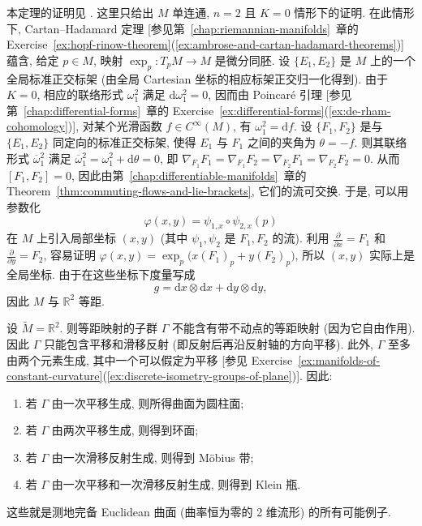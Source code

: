 \begin{RiemannProof}
本定理的证明见 . 这里只给出 $M$ 单连通, $n=2$ 且 $K=0$ 情形下的证明. 在此情形下, Cartan–Hadamard 定理 [参见第~\ref{chap:riemannian-manifolds}~章的 Exercise~\ref{ex:hopf-rinow-theorem}(\ref{ex:ambrose-and-cartan-hadamard-theorems})] 蕴含, 给定 $p\in M$, 映射 $\exp_p:T_pM\to M$ 是微分同胚. 设 $\{E_1,E_2\}$ 是 $M$ 上的一个全局标准正交标架 (由全局 Cartesian 坐标的相应标架正交归一化得到). 由于 $K=0$, 相应的联络形式 $\omega_1^2$ 满足 $\mathrm{d}\omega_1^2=0$, 因而由 Poincaré 引理 [参见第~\ref{chap:differential-forms}~章的 Exercise~\ref{ex:differential-forms}(\ref{ex:de-rham-cohomology})], 对某个光滑函数 $f\in C^\infty(M)$, 有 $\omega_1^2=\mathrm{d}f$. 设 $\{F_1,F_2\}$ 是与 $\{E_1,E_2\}$ 同定向的标准正交标架, 使得 $E_1$ 与 $F_1$ 之间的夹角为 $\theta=-f$. 则其联络形式 $\overline\omega{}_1^2$ 满足 $\overline\omega{}_1^2=\omega_1^2+\mathrm{d}\theta=0$, 即 $\nabla_{F_1}F_1=\nabla_{F_1}F_2=\nabla_{F_2}F_1=\nabla_{F_2}F_2=0$. 从而 $[F_1,F_2]=0$, 因此由第~\ref{chap:differentiable-manifolds}~章的 Theorem~\ref{thm:commuting-flows-and-lie-brackets}, 它们的流可交换. 于是, 可以用参数化
\[
  \varphi(x,y)=\psi_{1,x}\circ\psi_{2,x}(p)
\]
在 $M$ 上引入局部坐标 $(x,y)$ (其中 $\psi_1,\psi_2$ 是 $F_1,F_2$ 的流). 利用 $\frac{\partial}{\partial x}=F_1$ 和 $\frac{\partial}{\partial y}=F_2$, 容易证明 $\varphi(x,y)=\exp_p\bigl(x(F_1)_p+y(F_2)_p\bigr)$, 所以 $(x,y)$ 实际上是全局坐标. 由于在这些坐标下度量写成
\[
  g=\mathrm{d}x\otimes\mathrm{d}x+\mathrm{d}y\otimes\mathrm{d}y,
\]
因此 $M$ 与 $\mathbb{R}^2$ 等距.
\end{RiemannProof}

\begin{RiemannExample}\label{ex:complete-flat-surfaces}
设 $\widetilde M=\mathbb{R}^2$. 则等距映射的子群 $\Gamma$ 不能含有带不动点的等距映射 (因为它自由作用). 因此 $\Gamma$ 只能包含平移和滑移反射 (即反射后再沿反射轴的方向平移). 此外, $\Gamma$ 至多由两个元素生成, 其中一个可以假定为平移 [参见 Exercise~\ref{ex:manifolds-of-constant-curvature}(\ref{ex:discrete-isometry-groups-of-plane})]. 因此:
\begin{enumerate}[label=(\arabic*),leftmargin=*]
\item 若 $\Gamma$ 由一次平移生成, 则所得曲面为圆柱面;
\item 若 $\Gamma$ 由两次平移生成, 则得到环面;
\item 若 $\Gamma$ 由一次滑移反射生成, 则得到 Möbius 带;
\item 若 $\Gamma$ 由一次平移和一次滑移反射生成, 则得到 Klein 瓶.
\end{enumerate}
这些就是测地完备 Euclidean 曲面 (曲率恒为零的 2 维流形) 的所有可能例子.
\end{RiemannExample}

